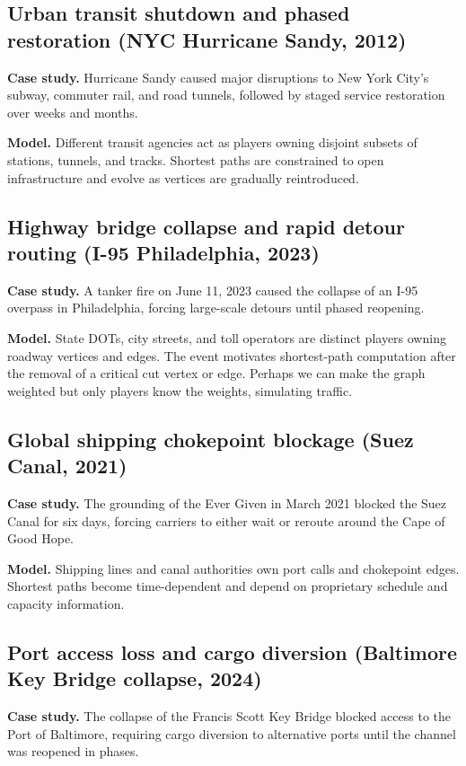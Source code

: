 \documentclass[11pt]{article}
\begin{document}
\subsection{Urban transit shutdown and phased restoration (NYC Hurricane Sandy, 2012)}
\textbf{Case study.} Hurricane Sandy caused major disruptions to New York City's subway, commuter rail, and road tunnels, followed by staged service restoration over weeks and months. \cite{nyu2012sandytransport,dot2013sandy}

\textbf{Model.} Different transit agencies act as players owning disjoint subsets of stations, tunnels, and tracks. Shortest paths are constrained to open infrastructure and evolve as vertices are gradually reintroduced.

\subsection{Highway bridge collapse and rapid detour routing (I-95 Philadelphia, 2023)}
\textbf{Case study.} A tanker fire on June 11, 2023 caused the collapse of an I-95 overpass in Philadelphia, forcing large-scale detours until phased reopening. \cite{axios2023i95,kodur2024i95}

\textbf{Model.} State DOTs, city streets, and toll operators are distinct players owning roadway vertices and edges. The event motivates shortest-path computation after the removal of a critical cut vertex or edge. Perhaps we can make the graph weighted but only players know the weights, simulating traffic.

\subsection{Global shipping chokepoint blockage (Suez Canal, 2021)}
\textbf{Case study.} The grounding of the Ever Given in March 2021 blocked the Suez Canal for six days, forcing carriers to either wait or reroute around the Cape of Good Hope. \cite{pemp2021suez,tran2025suez}

\textbf{Model.} Shipping lines and canal authorities own port calls and chokepoint edges. Shortest paths become time-dependent and depend on proprietary schedule and capacity information.

\subsection{Port access loss and cargo diversion (Baltimore Key Bridge collapse, 2024)}
\textbf{Case study.} The collapse of the Francis Scott Key Bridge blocked access to the Port of Baltimore, requiring cargo diversion to alternative ports until the channel was reopened in phases. \cite{ap2024baltimore,utk2024divert}
\end{document}
